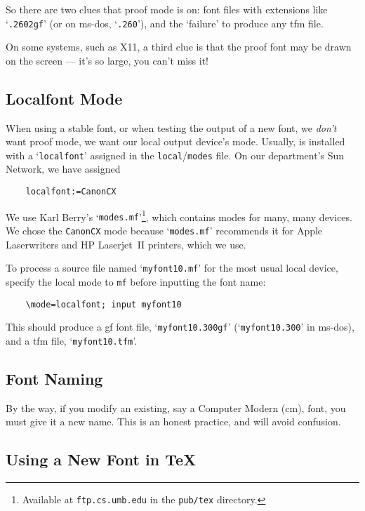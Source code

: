 So there are two clues that proof mode is on:  font files with
extensions like `{\tt .2602gf}' (or on {\sc ms-dos}, `{\tt .260}'),
and the `failure' to produce any {\sc tfm} file.

On some systems, such as {\sc X11}, a third clue is that the proof
font may be drawn on the screen --- it's so large, you can't miss it!


\subsection{Localfont Mode}\label{sub:localfont}

When using a stable font, or when testing the output of a new font,
we {\em don't\/} want proof mode,
we want our local output device's mode.
Usually, \MF{} is installed with a `{\tt localfont}'
assigned in the {\tt local}/{\tt modes} file.
On our department's Sun Network, we have assigned
\begin{verbatim}
    localfont:=CanonCX
\end{verbatim}
We use Karl {\sc Berry\/}'s `{\tt modes.mf}'\footnote
{Available at {\tt ftp.cs.umb.edu} in the {\tt pub/tex} directory.},
which contains modes for many, many devices.  We chose the
{\tt CanonCX} mode because `{\tt modes.mf}' recommends it for Apple
Laserwriters and HP Laserjet~II printers, which we use.

To process a \MF{} source file named `{\tt myfont10.mf}' for the most
usual local device, specify the local mode to {\tt mf} before
inputting the font name:
\begin{verbatim}
    \mode=localfont; input myfont10
\end{verbatim}
This should produce a {\sc gf} font file, `{\tt myfont10.300gf}'
(`{\tt myfont10.300}' in {\sc ms-dos}),
and a {\sc tfm} file, `{\tt myfont10.tfm}'.


\subsection{Font Naming}\label{sub:naming}

By the way, if you modify an existing, say a {\sc Computer
Modern (cm)}, font, you must give it a new name.  This is an honest
practice, and will avoid confusion.


\subsection{Using a New Font in \TeX{}}\label{sub:tex}

